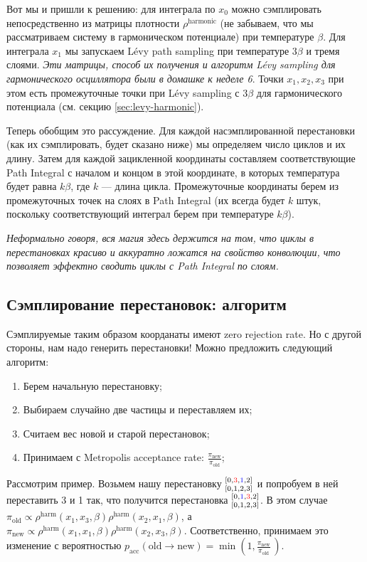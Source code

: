 \begin{lecture}
Вот мы и пришли к решению: для интеграла по $x_0$ можно сэмплировать непосредственно из матрицы плотности $\rho^{\text{harmonic}}$ (не забываем, что мы рассматриваем систему в гармоническом потенциале) при температуре $\beta$.
Для интеграла $x_1$ мы запускаем Lévy path sampling при температуре $3\beta$ и тремя слоями. \textit{Эти матрицы, способ их получения и алгоритм Lévy sampling для гармонического осциллятора были в домашке к неделе 6}.
Точки $x_1, x_2, x_3$ при этом есть промежуточные точки при Lévy sampling с $3\beta$ для гармонического потенциала (см. секцию \ref{sec:levy-harmonic}).

Теперь обобщим это рассуждение.
Для каждой насэмплированной перестановки (как их сэмплировать, будет сказано ниже) мы определяем число циклов и их длину.
Затем для каждой зацикленной координаты составляем соответствующие Path Integral с началом и концом в этой координате, в которых температура будет равна $k\beta$, где $k$ --- длина цикла.
Промежуточные координаты берем из промежуточных точек на слоях в Path Integral (их всегда будет $k$ штук, поскольку соответствующий интеграл берем при температуре $k\beta$).

\textit{Неформально говоря, вся магия здесь держится на том, что циклы в перестановках красиво и аккуратно ложатся на свойство конволюции, что позволяет эффектно сводить циклы с Path Integral по слоям.}

\subsection{Сэмплирование перестановок: алгоритм}

Сэмплируемые таким образом коорданаты имеют zero rejection rate.
Но с другой стороны, нам надо генерить перестановки!
Можно предложить следующий алгоритм:
\begin{enumerate}
    \item Берем начальную перестановку;
    \item Выбираем случайно две частицы и переставляем их;
    \item Считаем вес новой и старой перестановок;
    \item Принимаем с Metropolis acceptance rate: $\frac{\pi_\text{new}}{\pi_\text{old}}$;
\end{enumerate}

Рассмотрим пример.
Возьмем нашу перестановку ${}^{[0, {\color{red} 3}, {\color{blue} 1}, 2]}_{[0, 1, 2, 3]}$ и попробуем в ней переставить 3 и 1 так, что получится перестановка ${}^{[0, {\color{blue} 1}, {\color{red} 3}, 2]}_{[0, 1, 2, 3]}$.
В этом случае $\pi_\text{old} \propto \rho^{\text{harm}} (x_1, x_3, \beta) \rho^{\text{harm}}(x_2, x_1, \beta)$, а $\pi_\text{new} \propto \rho^{\text{harm}}(x_1, x_1, \beta) \rho^{\text{harm}}(x_2, x_3, \beta)$.
Соответственно, принимаем это изменение с вероятностью $p_\text{acc} (\text{old} \rightarrow \text{new}) = \min\left( 1, \frac{\pi_\text{new}}{\pi_\text{old}}\, \right)$.


\end{lecture}
